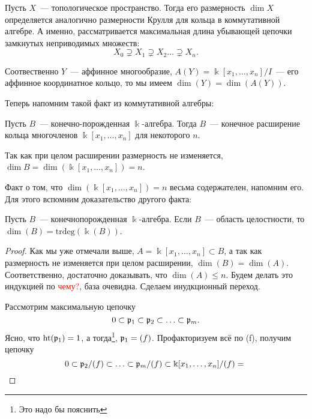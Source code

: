 	Пусть $X$~--- топологическое пространство. Тогда его размерность $\dim{X}$ определяется аналогично размерности Крулля для кольца в коммутативной алгебре. А именно, рассматривается максимальная длина убывающей цепочки замкнутых неприводимых множеств: 
	\[
		X_0 \supsetneq X_1 \supsetneq X_2 \ldots \supsetneq X_n.
	\]

	Соотвественно $Y$~--- аффинное многообразие, $A(Y) = \Bbbk[x_1, \ldots, x_n] / I$~--- его аффинное координатное кольцо, то мы имеем $\dim(Y) = \dim(A(Y))$. 

	Теперь напомним такой факт из коммутативной алгебры: 

	\begin{theorem} 
		Пусть $B$~--- конечно-порожденная $\Bbbk$-алгебра. Тогда $B$~--- конечное расширение кольца многочленов $\Bbbk[x_1, \ldots, x_n]$ для некоторого $n$. 
	\end{theorem}

	Так как при целом расширении размерность не изменяется, $\dim{B} = \dim(\Bbbk[x_1, \ldots, x_n]) = n$. 

	Факт о том, что $\dim(\Bbbk[x_1, \ldots, x_n]) = n$ весьма содержателен, напомним его. Для этого вспомним доказательство другого факта: 

	\begin{theorem} 
		Пусть $B$~--- конечнопорожденная $\Bbbk$-алгебра. Если $B$~--- область целостности, 	то $\dim(B) = \mathrm{trdeg}(\Bbbk(B))$.
	\end{theorem}
	\begin{proof}
		Как мы уже отмечали выше, $A = \Bbbk[x_1, \ldots, x_n] \subset B$, а так как размерность не изменяется при целом расширении, $\dim(B) = \dim(A)$. Соответственно, достаточно доказывать, что $\dim(A) \le n$. Будем делать это индукцией по \textcolor{red}{чему?}, база очевидна. Сделаем инудкционный переход. 

		Рассмотрим максимальную цепочку 
		\[
			0 \subset \mathfrak{p}_1 \subset \mathfrak{p}_2 \subset \ldots \subset \mathfrak{p}_m.
		\]
		Ясно, что $\mathrm{ht}(\mathfrak{p}_1) = 1$, а тогда\footnote{Это надо бы пояснить}, $\mathfrak{p}_1 = (f)$. Профакторизуем всё по (f), получим цепочку 
		\[
			0 \subset \mathfrak{p}_2/(f) \subset \ldots \subset \mathfrak{p}_m/(f) \subset \Bbbk[x_1, \ldots, x_n]/(f) = \
		\]

	\end{proof}




		
	



	